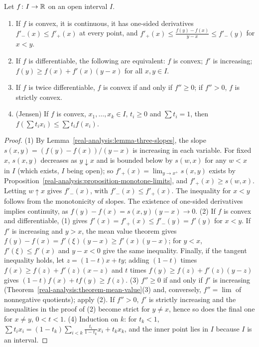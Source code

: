 \begin{proposition}\label{real-analysis:proposition-convex}
Let $f \colon I \to \mathbb{R}$ on an open interval $I$.
\begin{enumerate}
\item If $f$ is convex, it is continuous, it has one-sided derivatives $f'_-(x) \leq f'_+(x)$ at every point, and $f'_+(x) \leq \frac{f(y) - f(x)}{y - x} \leq f'_-(y)$ for $x < y$.
\item If $f$ is differentiable, the following are equivalent: $f$ is convex; $f'$ is increasing; $f(y) \geq f(x) + f'(x)(y - x)$ for all $x, y \in I$.
\item If $f$ is twice differentiable, $f$ is convex if and only if $f'' \geq 0$; if $f'' > 0$, $f$ is strictly convex.
\item (Jensen) If $f$ is convex, $x_1, \ldots, x_k \in I$, $t_i \geq 0$ and $\sum t_i = 1$, then $f(\sum t_ix_i) \leq \sum t_if(x_i)$.
\end{enumerate}
\end{proposition}

\begin{proof}
(1) By Lemma~\ref{real-analysis:lemma-three-slopes}, the slope $s(x, y) = (f(y) - f(x))/(y - x)$ is increasing in each variable. For fixed $x$, $s(x, y)$ decreases as $y \downarrow x$ and is bounded below by $s(w, x)$ for any
$w < x$ in $I$ (which exists, $I$ being open); so $f'_+(x) = \lim_{y \to x^+}s(x, y)$ exists by Proposition~\ref{real-analysis:proposition-monotone-limits}, and $f'_+(x) \geq s(w, x)$. Letting $w \uparrow x$ gives $f'_-(x)$, with
$f'_-(x) \leq f'_+(x)$. The inequality for $x < y$ follows from the monotonicity of slopes. The existence of one-sided derivatives implies continuity, as $f(y) - f(x) = s(x, y)(y - x) \to 0$.
(2) If $f$ is convex and differentiable, (1) gives $f'(x) = f'_+(x) \leq f'_-(y) = f'(y)$ for $x < y$. If $f'$ is increasing and $y > x$, the mean value theorem gives $f(y) - f(x) = f'(\xi)(y - x) \geq f'(x)(y - x)$; for $y < x$,
$f'(\xi) \leq f'(x)$ and $y - x < 0$ give the same inequality. Finally, if the tangent inequality holds, let $z = (1 - t)x + ty$; adding $(1 - t)$ times $f(x) \geq f(z) + f'(z)(x - z)$ and $t$ times $f(y) \geq f(z) + f'(z)(y - z)$ gives
$(1 - t)f(x) + tf(y) \geq f(z)$.
(3) $f'' \geq 0$ if and only if $f'$ is increasing (Theorem~\ref{real-analysis:theorem-mean-value}(3) and, conversely, $f'' = \lim$ of nonnegative quotients); apply (2). If $f'' > 0$, $f'$ is strictly increasing and the
inequalities in the proof of (2) become strict for $y \neq x$, hence so does the final one for $x \neq y$, $0 < t < 1$.
(4) Induction on $k$: for $t_k < 1$, $\sum t_ix_i = (1 - t_k)\sum_{i<k}\frac{t_i}{1 - t_k}x_i + t_kx_k$, and the inner point lies in $I$ because $I$ is an interval.
\end{proof}

